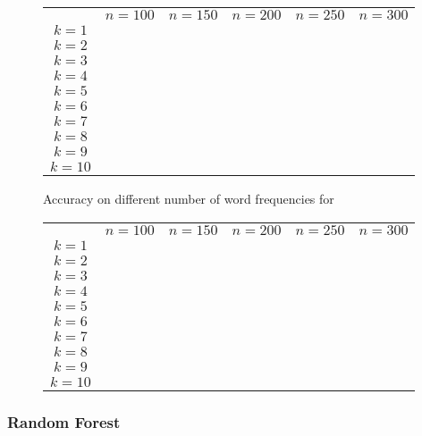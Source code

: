 \begin{figure}
    \begin{tabular}{cccccc}
               & $n=100$ & $n=150$ & $n=200$ & $n=250$ & $n=300$ \\
        $k=1$  &         &         &         &         &         \\
        $k=2$  &         &         &         &         &         \\
        $k=3$  &         &         &         &         &         \\
        $k=4$  &         &         &         &         &         \\
        $k=5$  &         &         &         &         &         \\
        $k=6$  &         &         &         &         &         \\
        $k=7$  &         &         &         &         &         \\
        $k=8$  &         &         &         &         &         \\
        $k=9$  &         &         &         &         &         \\
        $k=10$ &         &         &         &         &
    \end{tabular}
    \caption{Accuracy on different number of word frequencies for }
\end{figure}

\begin{figure}
    \begin{tabular}{cccccc}
               & $n=100$ & $n=150$ & $n=200$ & $n=250$ & $n=300$ \\
        $k=1$  &         &         &         &         &         \\
        $k=2$  &         &         &         &         &         \\
        $k=3$  &         &         &         &         &         \\
        $k=4$  &         &         &         &         &         \\
        $k=5$  &         &         &         &         &         \\
        $k=6$  &         &         &         &         &         \\
        $k=7$  &         &         &         &         &         \\
        $k=8$  &         &         &         &         &         \\
        $k=9$  &         &         &         &         &         \\
        $k=10$ &         &         &         &         &
    \end{tabular}
\end{figure}

\subsubsection{Random Forest}
